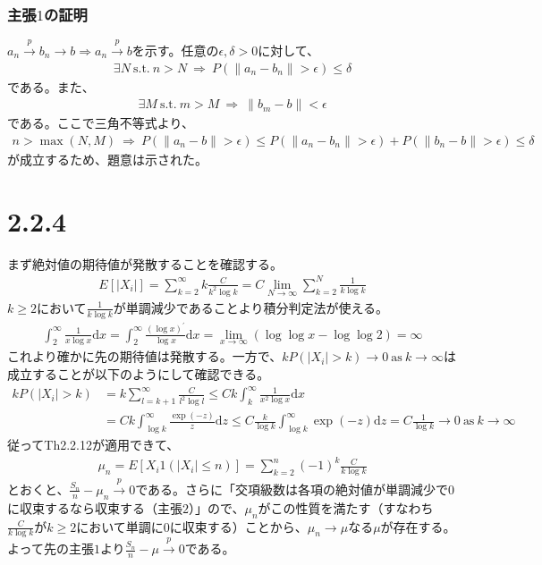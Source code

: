\documentclass{article}
\begin{document}
\subsubsection{主張$1$の証明}
$a_n \xrightarrow{p} b_n \to b \Rightarrow a_n \xrightarrow{p} b$を示す。任意の$\epsilon, \delta > 0$に対して、
\begin{align*}
	\exists N\ \text{s.t.}\ n > N\ \Rightarrow\ P(\| a_n -b_n \| > \epsilon) \leq \delta
\end{align*}
である。また、
\begin{align*}
	\exists M\ \text{s.t.}\ m > M\ \Rightarrow\ \|b_m-b\| < \epsilon
\end{align*}
である。ここで三角不等式より、
\begin{align*}
	n > \max(N,M)\ \Rightarrow\ P\left( \| a_n - b \| > \epsilon \right) \leq P\left( \| a_n - b_n \| > \epsilon \right) + P\left( \| b_n - b \| > \epsilon \right) \leq \delta
\end{align*}
が成立するため、題意は示された。

\section{2.2.4}
まず絶対値の期待値が発散することを確認する。
\begin{align*}
	E\left[ |X_i| \right] = \sum_{k = 2}^{\infty} k \frac{C}{k^2 \log k} = C \lim_{N \to \infty} \sum_{k = 2}^{N} \frac{1}{k \log k}
\end{align*}
$k \geq 2$において$\frac{1}{k \log k}$が単調減少であることより積分判定法が使える。
\begin{align*}
	\int_2^{\infty} \frac{1}{x\log x} \mathrm{d}x = \int_2^{\infty} \frac{\left( \log x \right)^{\prime}}{\log x} \mathrm{d}x = \lim_{x\to \infty}\left( \log \log x  - \log \log 2 \right)= \infty
\end{align*}
これより確かに先の期待値は発散する。一方で、$k P\left( |X_i| > k \right) \to 0\ \text{as}\ k \to \infty$は成立することが以下のようにして確認できる。
\begin{align*}
	k P\left( |X_i| > k \right) &= k \sum_{l = k+1}^{\infty} \frac{C}{l^2 \log l} \leq Ck \int_k^{\infty} \frac{1}{x^2 \log x} \mathrm{d}x\\
	&= Ck \int_{\log k}^{\infty} \frac{\exp(-z)}{z} \mathrm{d}z \leq C \frac{k}{\log k} \int_{\log k}^{\infty} \exp(-z) \mathrm{d}z = C \frac{1}{\log k} \to 0\ \text{as}\ k \to \infty
\end{align*}
従ってTh2.2.12が適用できて、
\begin{align*}
	\mu_n = E\left[ X_i 1\left( |X_i| \leq n \right) \right] = \sum_{k = 2}^{n} (-1)^k \frac{C}{k \log k}
\end{align*}
とおくと、$\frac{S_n}{n} - \mu_n \xrightarrow{p} 0$である。さらに「交項級数は各項の絶対値が単調減少で$0$に収束するなら収束する（主張$2$）」ので、$\mu_n$がこの性質を満たす（すなわち$\frac{C}{k\log k}$が$k \geq2$において単調に$0$に収束する）ことから、$\mu_n \to \mu$なる$\mu$が存在する。よって先の主張$1$より$\frac{S_n}{n} - \mu \xrightarrow{p} 0$である。
\end{document}
